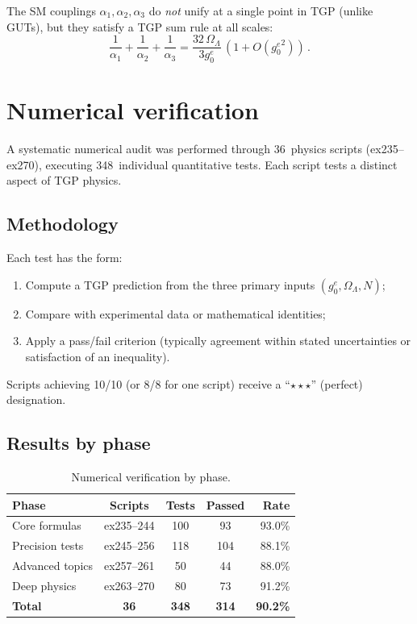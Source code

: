 \documentclass[aps,prd,twocolumn,superscriptaddress,showpacs,
  nofootinbib,floatfix,longbibliography]{revtex4-2}
\newcommand{\gone}{{g_0^e}}
\newcommand{\OL}{\Omega_\Lambda}
\begin{document}
The SM couplings $\alpha_1, \alpha_2, \alpha_3$ do \emph{not}
unify at a single point in TGP (unlike GUTs), but they satisfy
a TGP sum rule at all scales:
\begin{equation}
  \frac{1}{\alpha_1} + \frac{1}{\alpha_2} + \frac{1}{\alpha_3}
  = \frac{32\,\OL}{3\gone}\,\left(1 + O(\gone^2)\right)\,.
\end{equation}


\section{Numerical verification}\label{sec:numerical}

A systematic numerical audit was performed through 36~physics scripts
(ex235--ex270), executing 348~individual quantitative tests.
Each script tests a distinct aspect of TGP physics.

\subsection{Methodology}\label{ssec:methodology}

Each test has the form:
\begin{enumerate}
\item Compute a TGP prediction from the three primary inputs
  $(\gone, \OL, N)$;
\item Compare with experimental data or mathematical identities;
\item Apply a pass/fail criterion (typically agreement within
  stated uncertainties or satisfaction of an inequality).
\end{enumerate}

Scripts achieving 10/10 (or 8/8 for one script) receive a
``$\star\star\star$'' (perfect) designation.


\subsection{Results by phase}\label{ssec:results-phase}

\begin{table}[t]
\caption{Numerical verification by phase.}\label{tab:scores}
\begin{ruledtabular}
\begin{tabular}{lcccr}
Phase & Scripts & Tests & Passed & Rate \\
\hline
Core formulas   & ex235--244 & 100 & 93 & 93.0\% \\
Precision tests & ex245--256 & 118 & 104 & 88.1\% \\
Advanced topics & ex257--261 &  50 & 44 & 88.0\% \\
Deep physics    & ex263--270 &  80 & 73 & 91.2\% \\
\hline
\textbf{Total}  & \textbf{36} & \textbf{348} & \textbf{314} & \textbf{90.2\%} \\
\end{tabular}
\end{ruledtabular}
\end{table}
\end{document}
